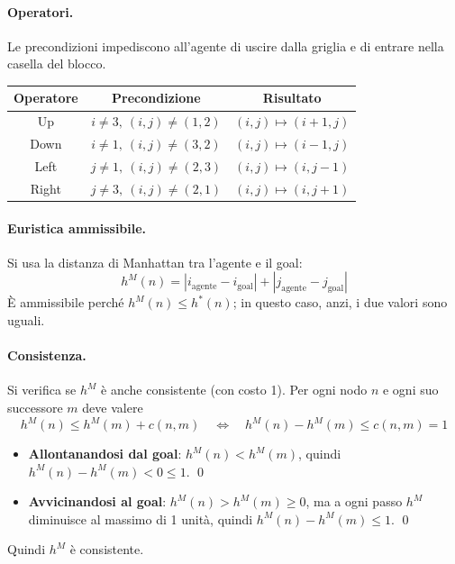 \documentclass[a4paper, 11pt, oneside]{book}
\theoremstyle{definition}
\begin{document}
    \paragraph{Operatori.} Le precondizioni impediscono all'agente di uscire dalla griglia e
    di entrare nella casella del blocco.
    \begin{center}
        \begin{tabular}{ |c|c|c| }
            \hline
            Operatore & Precondizione & Risultato \\
            \hline
            Up    & \( i \neq 3,\ (i, j) \neq (1, 2) \) & \( (i, j) \mapsto (i + 1, j) \) \\
            Down  & \( i \neq 1,\ (i, j) \neq (3, 2) \) & \( (i, j) \mapsto (i - 1, j) \) \\
            Left  & \( j \neq 1,\ (i, j) \neq (2, 3) \) & \( (i, j) \mapsto (i, j - 1) \) \\
            Right & \( j \neq 3,\ (i, j) \neq (2, 1) \) & \( (i, j) \mapsto (i, j + 1) \) \\
            \hline
        \end{tabular}
    \end{center}

    \paragraph{Euristica ammissibile.} Si usa la distanza di Manhattan tra l'agente e il goal:
    \[
        h^M(n) = |i_{\text{agente}} - i_{\text{goal}}| + |j_{\text{agente}} - j_{\text{goal}}|
    \]
    \`E ammissibile perch\'e $h^M(n) \leq h^*(n)$; in questo caso, anzi, i due valori sono
    uguali.

    \paragraph{Consistenza.} Si verifica se $h^M$ \`e anche consistente (con costo 1). Per ogni
    nodo $n$ e ogni suo successore $m$ deve valere
    \[
        h^M(n) \leq h^M(m) + c(n, m)
        \quad\Longleftrightarrow\quad
        h^M(n) - h^M(m) \leq c(n, m) = 1
    \]
    \begin{itemize}
        \item \textbf{Allontanandosi dal goal}: $h^M(n) < h^M(m)$, quindi
            $h^M(n) - h^M(m) < 0 \leq 1$. \qed
        \item \textbf{Avvicinandosi al goal}: $h^M(n) > h^M(m) \geq 0$, ma a ogni passo
            $h^M$ diminuisce al massimo di 1 unit\`a, quindi $h^M(n) - h^M(m) \leq 1$.
            \qed
    \end{itemize}
    Quindi $h^M$ \`e consistente.
\end{document}
